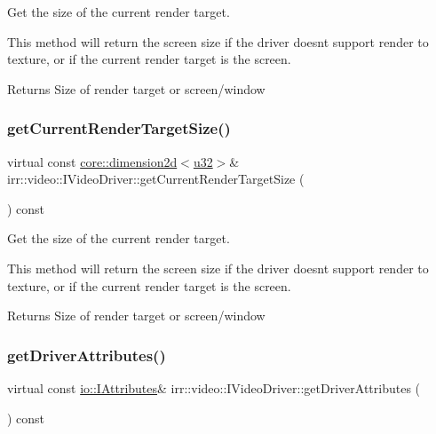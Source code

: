 Get the size of the current render target. 

This method will return the screen size if the driver doesn\textquotesingle{}t support render to texture, or if the current render target is the screen. \begin{DoxyReturn}{Returns}
Size of render target or screen/window 
\end{DoxyReturn}
\mbox{\label{classirr_1_1video_1_1IVideoDriver_a76fc2aba131b5986d07d92c6888cfc0c}} 
\subsubsection{\texorpdfstring{get\+Current\+Render\+Target\+Size()}{getCurrentRenderTargetSize()}\hspace{0.1cm}{\footnotesize\ttfamily [2/2]}}
{\footnotesize\ttfamily virtual const \hyperlink{classirr_1_1core_1_1dimension2d}{core\+::dimension2d}$<$\hyperlink{namespaceirr_a0416a53257075833e7002efd0a18e804}{u32}$>$\& irr\+::video\+::\+I\+Video\+Driver\+::get\+Current\+Render\+Target\+Size (\begin{DoxyParamCaption}{ }\end{DoxyParamCaption}) const\hspace{0.3cm}{\ttfamily [pure virtual]}}



Get the size of the current render target. 

This method will return the screen size if the driver doesn\textquotesingle{}t support render to texture, or if the current render target is the screen. \begin{DoxyReturn}{Returns}
Size of render target or screen/window 
\end{DoxyReturn}
\mbox{\label{classirr_1_1video_1_1IVideoDriver_a2b43d2215f2e5aad9b4f92aa635bcc85}} 
\subsubsection{\texorpdfstring{get\+Driver\+Attributes()}{getDriverAttributes()}\hspace{0.1cm}{\footnotesize\ttfamily [1/2]}}
{\footnotesize\ttfamily virtual const \hyperlink{classirr_1_1io_1_1IAttributes}{io\+::\+I\+Attributes}\& irr\+::video\+::\+I\+Video\+Driver\+::get\+Driver\+Attributes (\begin{DoxyParamCaption}{ }\end{DoxyParamCaption}) const\hspace{0.3cm}{\ttfamily [pure virtual]}}



